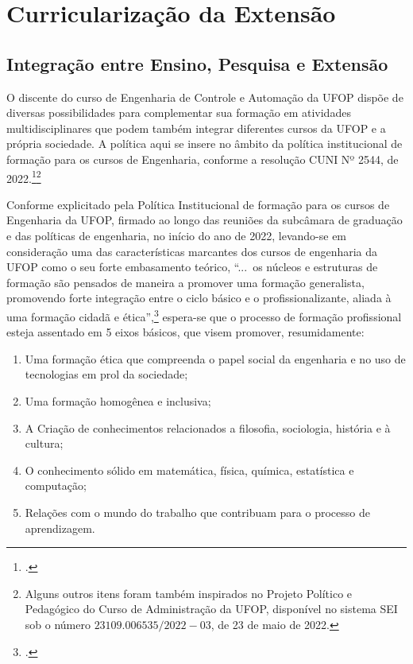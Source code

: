 \documentclass[
	12pt,				%
	openright,			%
	oneside,			%
	a4paper,			%
	english,			%
	brazil				%
	]{abntex2}
\begin{document}
\chapter{Curricularização da Extensão}

\section{Integração entre Ensino, Pesquisa e Extensão}

O discente do curso de Engenharia de Controle e Automação da UFOP dispõe de diversas possibilidades para complementar sua formação em atividades multidisciplinares que podem também integrar diferentes cursos da UFOP e a própria sociedade. A política aqui se insere no âmbito da política institucional de formação para os cursos de Engenharia, conforme a resolução CUNI Nº 2544, de 2022.\footcites[Em especial podemos citar o trecho II da referida política, que inclui os chamados Núcleos e Estruturas de formação, bem como a questão da curricularização da extensão. Ver em][pp.~16--26]{politica-eng-2022-ufop}\footnote{Alguns outros itens foram também inspirados no Projeto Político e Pedagógico do Curso de Administração da UFOP, disponível no sistema SEI sob o número $23109.006535/2022-03$, de 23 de maio de 2022.}

Conforme explicitado pela Política Institucional de formação para os cursos de Engenharia da UFOP, firmado ao longo das reuniões da subcâmara de graduação e das políticas de engenharia, no início do ano de 2022, levando-se em consideração uma das características marcantes dos cursos de engenharia da UFOP como o seu forte embasamento teórico, ``...~os núcleos e estruturas de formação são pensados de maneira a promover uma formação generalista, promovendo forte integração entre o ciclo básico e o profissionalizante, aliada à uma formação cidadã e ética'',\footcite[p.~17]{politica-eng-2022-ufop} espera-se que o processo de formação profissional esteja assentado em 5 eixos básicos, que visem promover, resumidamente:
\begin{enumerate}
    \item Uma formação ética que compreenda o papel social da engenharia e no uso de tecnologias em prol da sociedade;
    \item Uma formação homogênea e inclusiva;
    \item A Criação de conhecimentos relacionados a filosofia, sociologia, história e à cultura;
    \item O conhecimento sólido em matemática, física, química, estatística e computação;
    \item Relações com o mundo do trabalho que contribuam para o processo de aprendizagem.
\end{enumerate}
\end{document}

